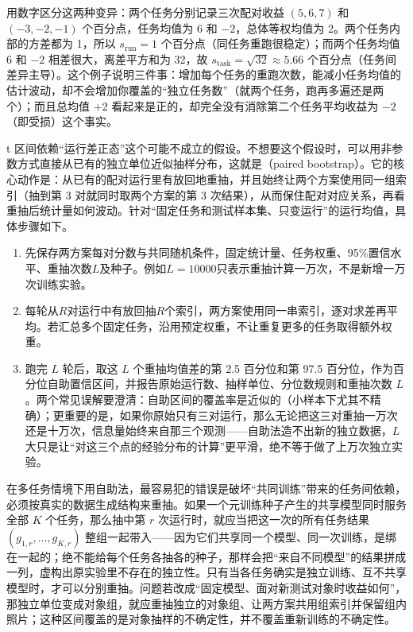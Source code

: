 用数字区分这两种变异：两个任务分别记录三次配对收益 $(5,6,7)$ 和 $(-3,-2,-1)$ 个百分点，任务均值为 6 和 $-2$，总体等权均值为 2。两个任务内部的方差都为 1，所以 $s_{\mathrm{run}}=1$ 个百分点（同任务重跑很稳定）；而两个任务均值 6 和 $-2$ 相差很大，离差平方和为 32，故 $s_{\mathrm{task}}=\sqrt{32}\approx5.66$ 个百分点（任务间差异主导）。这个例子说明三件事：增加每个任务的重跑次数，能减小任务均值的估计波动，却不会增加你覆盖的“独立任务数”（就两个任务，跑再多遍还是两个）；而且总均值 $+2$ 看起来是正的，却完全没有消除第二个任务平均收益为 $-2$（即受损）这个事实。

t 区间依赖“运行差正态”这个可能不成立的假设。不想要这个假设时，可以用非参数方式直接从已有的独立单位近似抽样分布，这就是（paired bootstrap）。它的核心动作是：从已有的配对运行里有放回地重抽，并且始终让两个方案使用同一组索引（抽到第 3 对就同时取两个方案的第 3 次结果），从而保住配对对应关系，再看重抽后统计量如何波动。针对“固定任务和测试样本集、只变运行”的运行均值，具体步骤如下。
\begin{enumerate}
  \item 先保存两方案每对分数与共同随机条件，固定统计量、任务权重、95\%置信水平、重抽次数$L$及种子。例如$L=10000$只表示重抽计算一万次，不是新增一万次训练实验。
  \item 每轮从$R$对运行中有放回抽$R$个索引，两方案使用同一串索引，逐对求差再平均。若汇总多个固定任务，沿用预定权重，不让重复更多的任务取得额外权重。
  \item 跑完 $L$ 轮后，取这 $L$ 个重抽均值差的第 2.5 百分位和第 97.5 百分位，作为百分位自助置信区间，并报告原始运行数、抽样单位、分位数规则和重抽次数 $L$。两个常见误解要澄清：自助区间的覆盖率是近似的（小样本下尤其不精确）；更重要的是，如果你原始只有三对运行，那么无论把这三对重抽一万次还是十万次，信息量始终来自那三个观测——自助法造不出新的独立数据，$L$ 大只是让“对这三个点的经验分布的计算”更平滑，绝不等于做了上万次独立实验。
\end{enumerate}

在多任务情境下用自助法，最容易犯的错误是破坏“共同训练”带来的任务间依赖，必须按真实的数据生成结构来重抽。如果一个元训练种子产生的共享模型同时服务全部 $K$ 个任务，那么抽中第 $r$ 次运行时，就应当把这一次的所有任务结果 $(g_{1,r},\ldots,g_{K,r})$ 整组一起带入——因为它们共享同一个模型、同一次训练，是绑在一起的；绝不能给每个任务各抽各的种子，那样会把“来自不同模型”的结果拼成一列，虚构出原实验里不存在的独立性。只有当各任务确实是独立训练、互不共享模型时，才可以分别重抽。问题若改成“固定模型、面对新测试对象时收益如何”，那独立单位变成对象组，就应重抽独立的对象组、让两方案共用组索引并保留组内照片；这种区间覆盖的是对象抽样的不确定性，并不覆盖重新训练的不确定性。

